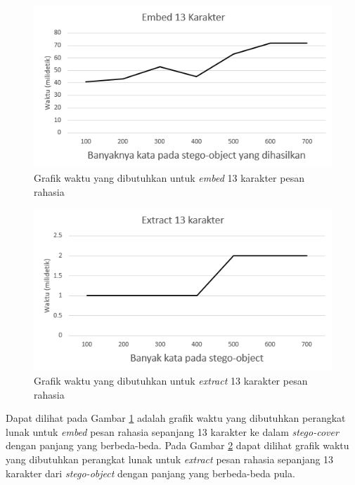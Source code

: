 \begin{figure}[H]
	\centering
	\includegraphics[scale=0.8]{Gambar/graf-embed-13-karakter}
	\caption{Grafik waktu yang dibutuhkan untuk \textit{embed} 13 karakter pesan rahasia} 
	\label{fig:graf-embed-13-karakter}
\end{figure}

\begin{figure}[H]
	\centering
	\includegraphics[scale=0.8]{Gambar/graf-extract-13-karakter}
	\caption{Grafik waktu yang dibutuhkan untuk \textit{extract} 13 karakter pesan rahasia} 
	\label{fig:graf-extract-13-karakter}
\end{figure}

Dapat dilihat pada Gambar \ref{fig:graf-embed-13-karakter} adalah grafik waktu yang dibutuhkan perangkat lunak untuk \textit{embed} pesan rahasia sepanjang 13 karakter ke dalam \textit{stego-cover} dengan panjang yang berbeda-beda. Pada Gambar \ref{fig:graf-extract-13-karakter} dapat dilihat grafik waktu yang dibutuhkan perangkat lunak untuk \textit{extract} pesan rahasia sepanjang 13 karakter dari \textit{stego-object} dengan panjang yang berbeda-beda pula.

